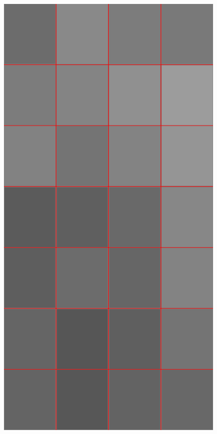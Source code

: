 \documentclass{article}
\begin{document}
\begin{figure}[h!]
{		\includegraphics[height=0.3\textheight]{pictures/Raster_grau.png}
		\label{pic:raster_grau}
	}
\end{figure}
\end{document}
